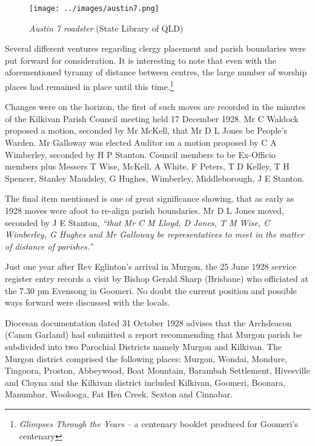 \begin{figure}[!htb]
\begin{center}
\texttt{[image: ../images/austin7.png]}
\caption{{\itshape Austin 7 roadster} {\scriptsize(State Library of QLD)}}
\end{center}
\end{figure}




Several different ventures regarding clergy placement and parish boundaries were put forward for consideration. It is interesting to note that even with the aforementioned tyranny of distance between centres, the large number of worship places had remained in place until this time.\footnote{\emph{Glimpses Through the Years --} a centenary booklet produced for Goomeri's centenary}


Changes were on the horizon, the first of such moves are recorded in the minutes of the Kilkivan Parish Council meeting held 17 December 1928. Mr C Waldock proposed a motion, seconded by Mr McKell, that Mr D L Jones be People's Warden. Mr Galloway was elected Auditor on a motion proposed by C A Wimberley, seconded by H P Stanton. Council members to be Ex-Officio members plus Messers T Wise, McKell, A White. F Peters, T D Kelley, T H Spencer, Stanley Maudsley, G Hughes, Wimberley, Middleborough, J E Stanton.



The final item mentioned is one of great significance showing, that as early as 1928 moves were afoot to re-align parish boundaries. Mr D L Jones moved, seconded by J E Stanton, \emph{``that Mr C M Lloyd, D Jones, T M Wise, C Wimberley, G Hughes and Mr Galloway be representatives to meet in the matter of distance of parishes.''}



Just one year after Rev Eglinton's arrival in Murgon, the 25 June 1928 service register entry records a visit by Bishop Gerald Sharp (Brisbane) who officiated at the 7.30 pm Evensong in Goomeri. No doubt the current position and possible ways forward were discussed with the locals.



Diocesan documentation dated 31 October 1928 advises that the Archdeacon (Canon Garland) had submitted a report recommending that Murgon parish be subdivided into two Parochial Districts namely Murgon and Kilkivan. The Murgon district comprised the following places: Murgon, Wondai, Mondure, Tingoora, Proston, Abbeywood, Boat Mountain, Barambah Settlement, Hivesville and Cloyna and the Kilkivan district included Kilkivan, Goomeri, Boonara, Manumbar, Woolooga, Fat Hen Creek, Sexton and Cinnabar.



